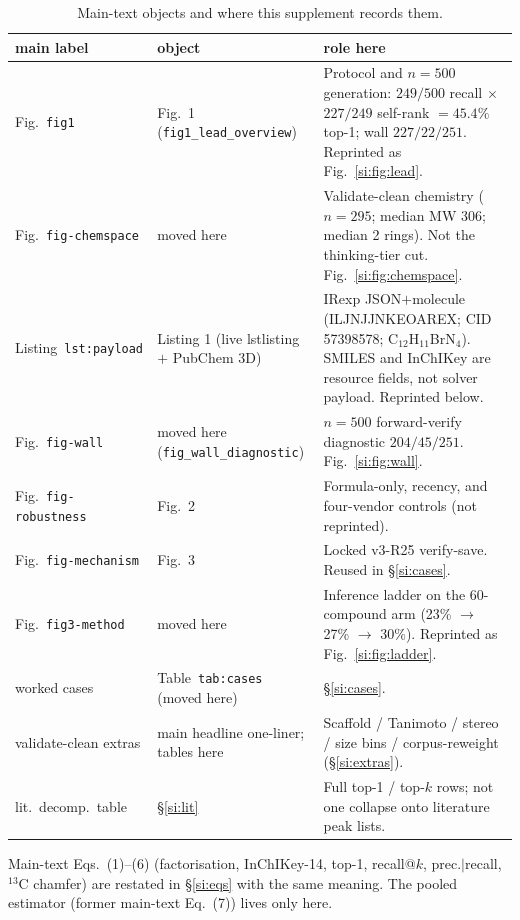 \documentclass[11pt]{article}
\newcounter{listing}
\begin{document}
\begin{table}[h]
\caption{Main-text objects and where this supplement records them.}
\centering
\small
\begin{tabular}{@{}ll>{\raggedright\arraybackslash}p{6.2cm}@{}}
\toprule
main label & object & role here \\
\midrule
Fig.~\texttt{fig1} &
  Fig.~1 (\texttt{fig1\_lead\_overview}) &
  Protocol and $n{=}500$ generation:
  $249/500$ recall $\times$ $227/249$ self-rank $=45.4\%$ top-1;
  wall $227/22/251$. Reprinted as Fig.~\ref{si:fig:lead}. \\
Fig.~\texttt{fig-chemspace} &
  moved here &
  Validate-clean chemistry ($n{=}295$; median MW 306; median 2 rings).
  Not the thinking-tier cut. Fig.~\ref{si:fig:chemspace}. \\
Listing~\texttt{lst:payload} &
  Listing 1 (live lstlisting $+$ PubChem 3D) &
  IRexp JSON$+$molecule (ILJNJJNKEOAREX; CID 57398578;
  C$_{12}$H$_{11}$BrN$_{4}$).
  SMILES and InChIKey are resource fields, not solver payload.
  Reprinted below. \\
Fig.~\texttt{fig-wall} &
  moved here (\texttt{fig\_wall\_diagnostic}) &
  $n{=}500$ forward-verify diagnostic $204/45/251$.
  Fig.~\ref{si:fig:wall}. \\
Fig.~\texttt{fig-robustness} &
  Fig.~2 &
  Formula-only, recency, and four-vendor controls (not reprinted). \\
Fig.~\texttt{fig-mechanism} &
  Fig.~3 &
  Locked v3-R25 verify-save. Reused in \S\ref{si:cases}. \\
Fig.~\texttt{fig3-method} &
  moved here &
  Inference ladder on the 60-compound arm
  (23\% $\to$ 27\% $\to$ 30\%).
  Reprinted as Fig.~\ref{si:fig:ladder}. \\
worked cases &
  Table~\texttt{tab:cases} (moved here) &
  \S\ref{si:cases}. \\
validate-clean extras &
  main headline one-liner; tables here &
  Scaffold / Tanimoto / stereo / size bins / corpus-reweight
  (\S\ref{si:extras}). \\
lit.\ decomp.\ table &
  \S\ref{si:lit} &
  Full top-1 / top-$k$ rows; not one collapse onto literature peak lists. \\
\bottomrule
\end{tabular}
\end{table}

Main-text Eqs.~(1)--(6) (factorisation, InChIKey-14, top-1, recall@$k$,
prec.$|$recall, $^{13}$C chamfer) are restated in
\S\ref{si:eqs} with the same meaning.
The pooled estimator (former main-text Eq.~(7)) lives only here.
\end{document}
